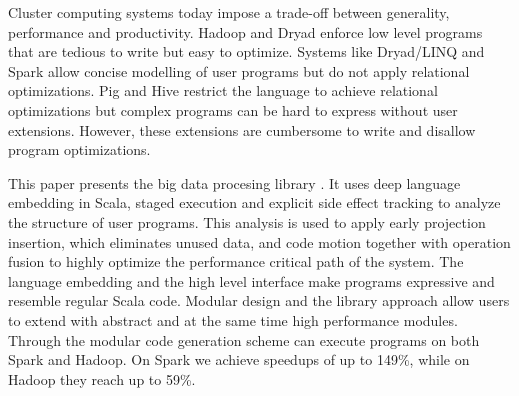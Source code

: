 Cluster computing systems today impose a trade-off between generality, performance and productivity. Hadoop and Dryad enforce low level programs that are tedious to write but easy to optimize. Systems like Dryad/LINQ and Spark allow concise modelling of user programs but do not apply relational optimizations. Pig and Hive restrict the language to achieve relational optimizations but complex programs can be hard to express without user extensions. However, these extensions are cumbersome to write and disallow program optimizations.

This paper presents the big data procesing library \tool. It uses deep language embedding in Scala, staged execution and explicit side effect tracking to analyze the structure of user programs. This analysis is used to apply early projection insertion, which eliminates unused data, and code motion together with operation fusion to highly optimize the performance critical path of the system. The language embedding and the high level interface make \tool programs expressive and resemble regular Scala code. Modular design and the library approach allow users to extend \tool with abstract and at the same time high performance modules. Through the modular code generation scheme \tool can execute programs on both Spark and Hadoop. On Spark we achieve speedups of up to 149\%, while on Hadoop they reach up to 59\%.